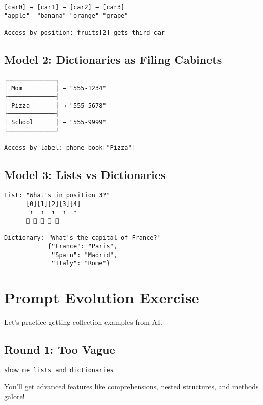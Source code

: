 \documentclass[
  letterpaper,
  DIV=11,
  numbers=noendperiod,
  oneside]{scrreprt}
\begin{document}
\begin{verbatim}
[car0] → [car1] → [car2] → [car3]
"apple"  "banana" "orange" "grape"

Access by position: fruits[2] gets third car
\end{verbatim}

\subsection{Model 2: Dictionaries as Filing
Cabinets}\label{model-2-dictionaries-as-filing-cabinets}

\begin{verbatim}
┌─────────────┐
│ Mom         │ → "555-1234"
├─────────────┤
│ Pizza       │ → "555-5678"  
├─────────────┤
│ School      │ → "555-9999"
└─────────────┘

Access by label: phone_book["Pizza"]
\end{verbatim}

\subsection{Model 3: Lists vs
Dictionaries}\label{model-3-lists-vs-dictionaries}

\begin{verbatim}
List: "What's in position 3?"
      [0][1][2][3][4]
       ↑  ↑  ↑  ↑  ↑
      🍎 🍌 🍊 🍇 🍓

Dictionary: "What's the capital of France?"
            {"France": "Paris",
             "Spain": "Madrid",
             "Italy": "Rome"}
\end{verbatim}

\section{Prompt Evolution Exercise}\label{prompt-evolution-exercise-6}

Let's practice getting collection examples from AI.

\subsection{Round 1: Too Vague}\label{round-1-too-vague-6}

\begin{verbatim}
show me lists and dictionaries
\end{verbatim}

You'll get advanced features like comprehensions, nested structures, and
methods galore!
\end{document}
